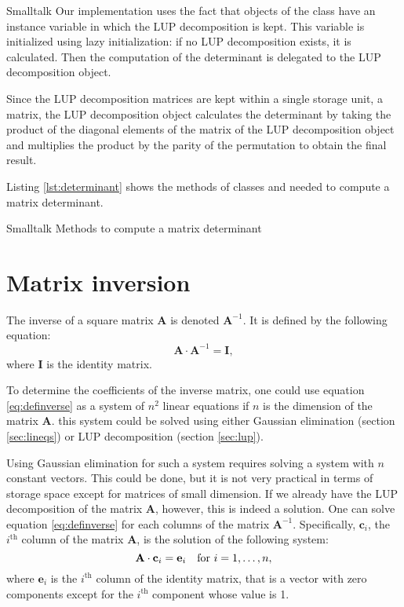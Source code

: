 \begin{displaycode}{Smalltalk}
Our implementation uses the fact that objects of the class  have an instance variable in which the LUP decomposition
is kept. This variable is initialized using lazy initialization:
if no LUP decomposition exists, it is calculated. Then the
computation of the determinant is delegated to the LUP
decomposition object.

Since the LUP decomposition matrices are kept within a single
storage unit, a matrix, the LUP decomposition object calculates
the determinant by taking the product of the diagonal elements of
the matrix of the LUP decomposition object and multiplies the
product by the parity of the permutation to obtain the final
result.

Listing \ref{lst:determinant} shows the methods of classes  and  needed to compute a matrix determinant.

\begin{listing}[label=lst:determinant]{Smalltalk}
{Methods to compute a matrix determinant}
%
%
\end{listing}

\section{Matrix inversion}
\label{sec:matrixinversion} The inverse of a square matrix $\textbf{A}$ is denoted $\textbf{A}^{-1}$. It is defined by the following
equation:
\begin{equation}
\label{eq:definverse} \textbf{A}\cdot\textbf{A}^{-1}=\textbf{I},
\end{equation}
where $\textbf{I}$ is the identity matrix.

To determine the coefficients of the inverse matrix, one could use
equation \ref{eq:definverse} as a system of $n^2$ linear equations
if $n$ is the dimension of the matrix $\textbf{A}$. this system could
be solved using either Gaussian elimination (\cf section
\ref{sec:lineqs}) or LUP decomposition (\cf section
\ref{sec:lup}).

Using Gaussian elimination for such a system requires solving a
system with $n$ constant vectors. This could be done, but it is
not very practical in terms of storage space except for matrices
of small dimension. If we already have the LUP decomposition of
the matrix $\textbf{A}$, however, this is indeed a solution. One can
solve equation \ref{eq:definverse} for each columns of the matrix
$\textbf{A}^{-1}$. Specifically, $\textbf{c}_i$, the $i^{\mathop{th}}$
column of the matrix $\textbf{A}$, is the solution of the following
system:
\begin{equation}
  \textbf{A}\cdot\textbf{c}_i=\textbf{e}_i\mbox{\quad for $i=1,\ldots,n$},
\end{equation}
where $\textbf{e}_i$ is the $i^{\mathop{th}}$ column of the identity
matrix, that is a vector with zero components except for the
$i^{\mathop{th}}$ component whose value is 1.


\end{displaycode}
